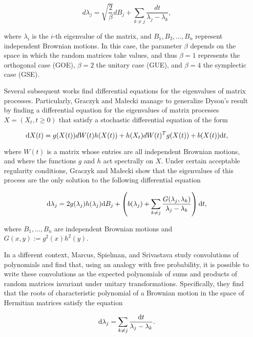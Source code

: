 \begin{equation}
d\lambda_j = \sqrt{\frac2\beta} dB_j + \sum_{k\neq j} \frac{dt}{\lambda_j-\lambda_k}, \label{eq:dys}
\end{equation}

where $\lambda_i$ is the $i$-th eigenvalue of the matrix, and $B_1, B_2,\dots,B_n$ represent independent Brownian motions. In this case, the parameter $\beta$ depends on the space in which the random matrices take values, and thus $\beta=1$ represents the orthogonal case (GOE), $\beta=2$ the unitary case (GUE), and $\beta=4$ the symplectic case (GSE).

Several subsequent works find differential equations for the eigenvalues of matrix processes. Particularly, Graczyk and Małecki \cite{article:multiyamada} manage to generalize Dyson's result by finding a differential equation for the eigenvalues of matrix processes $X = (X_t, t\ge 0)$ that satisfy a stochastic differential equation of the form

\begin{equation}
\mathrm d X(t) = g(X(t))d W(t)h(X(t)) + h(X_t)dW(t)^Tg(X(t)) + b(X(t))\mathrm d t,
\end{equation}

where $W(t)$ is a matrix whose entries are all independent Brownian motions, and where the functions $g$ and $h$ act spectrally on $X$. Under certain acceptable regularity conditions, Graczyk and Małecki show that the eigenvalues of this process are the only solution to the following differential equation

\begin{equation}
\mathrm d\lambda_j = 2g(\lambda_j)h(\lambda_j)\mathrm d B_j + \left( b(\lambda_j) + \sum_{k\neq j} \frac{G(\lambda_j,\lambda_k)}{\lambda_j - \lambda_k} \right)\mathrm d t,
\end{equation}

where $B_1,\dots,B_n$ are independent Brownian motions and $G(x,y) := g^2(x)h^2(y)$.

In a different context, Marcus, Spielman, and Srivastava \cite{article:finitefree} study convolutions of polynomials and find that, using an analogy with free probability, it is possible to write these convolutions as the expected polynomials of sums and products of random matrices invariant under unitary transformations. Specifically, they find that the roots of characteristic polynomial of a Brownian motion in the space of Hermitian matrices satisfy the equation

\begin{equation} \label{eq:det_dys}
\mathrm d\lambda_j = \sum_{k\neq j} \frac{\mathrm d t}{\lambda_j-\lambda_k}.
\end{equation}

